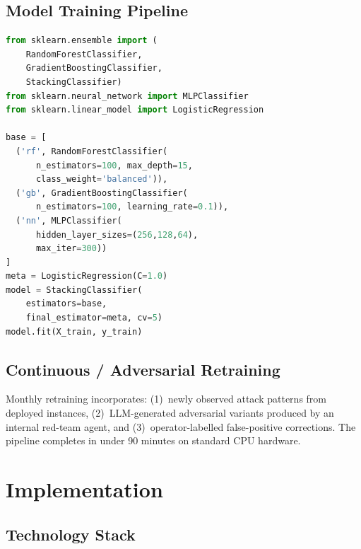 \documentclass[10pt,twocolumn]{article}
\begin{document}
\subsection{Model Training Pipeline}

\begin{lstlisting}[language=Python, caption={Ensemble training pipeline}]
from sklearn.ensemble import (
    RandomForestClassifier,
    GradientBoostingClassifier,
    StackingClassifier)
from sklearn.neural_network import MLPClassifier
from sklearn.linear_model import LogisticRegression

base = [
  ('rf', RandomForestClassifier(
      n_estimators=100, max_depth=15,
      class_weight='balanced')),
  ('gb', GradientBoostingClassifier(
      n_estimators=100, learning_rate=0.1)),
  ('nn', MLPClassifier(
      hidden_layer_sizes=(256,128,64),
      max_iter=300))
]
meta = LogisticRegression(C=1.0)
model = StackingClassifier(
    estimators=base,
    final_estimator=meta, cv=5)
model.fit(X_train, y_train)
\end{lstlisting}

\subsection{Continuous / Adversarial Retraining}

Monthly retraining incorporates:
(1)~newly observed attack patterns from deployed instances,
(2)~LLM-generated adversarial variants produced by an internal
red-team agent, and (3)~operator-labelled false-positive corrections.
The pipeline completes in under 90 minutes on standard CPU hardware.

\section{Implementation}
\label{sec:impl}

\subsection{Technology Stack}
\end{document}
